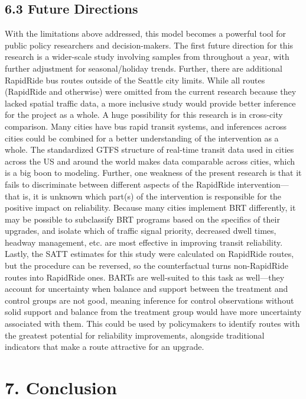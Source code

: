 \documentclass[
  12pt,
]{article}
\begin{document}
\subsection{6.3 Future Directions}\label{future-directions}

With the limitations above addressed, this model becomes a powerful tool
for public policy researchers and decision-makers. The first future
direction for this research is a wider-scale study involving samples
from throughout a year, with further adjustment for seasonal/holiday
trends. Further, there are additional RapidRide bus routes outside of
the Seattle city limits. While all routes (RapidRide and otherwise) were
omitted from the current research because they lacked spatial traffic
data, a more inclusive study would provide better inference for the
project as a whole. A huge possibility for this research is in
cross-city comparison. Many cities have bus rapid transit systems, and
inferences across cities could be combined for a better understanding of
the intervention as a whole. The standardized GTFS structure of
real-time transit data used in cities across the US and around the world
makes data comparable across cities, which is a big boon to modeling.
Further, one weakness of the present research is that it fails to
discriminate between different aspects of the RapidRide
intervention---that is, it is unknown which part(s) of the intervention
is responsible for the positive impact on reliability. Because many
cities implement BRT differently, it may be possible to subclassify BRT
programs based on the specifics of their upgrades, and isolate which of
traffic signal priority, decreased dwell times, headway management, etc.
are most effective in improving transit reliability. Lastly, the SATT
estimates for this study were calculated on RapidRide routes, but the
procedure can be reversed, so the counterfactual turns non-RapidRide
routes into RapidRide ones. BARTs are well-suited to this task as
well---they account for uncertainty when balance and support between the
treatment and control groups are not good, meaning inference for control
observations without solid support and balance from the treatment group
would have more uncertainty associated with them. This could be used by
policymakers to identify routes with the greatest potential for
reliability improvements, alongside traditional indicators that make a
route attractive for an upgrade.

\section{7. Conclusion}\label{conclusion}
\end{document}

